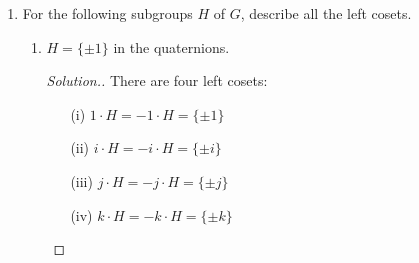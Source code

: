 \documentclass{article}
\newcommand{\sk}{\smallskip}
\begin{document}
\begin{enumerate}
\begin{proof}[Solution.]
        \sk

        Third, we show that $\psi$ is surjective, namely that for every $\varphi_g \in \{\varphi_g : g \in G\}$, there is a $hZ \in \{hZ : h \in G\}$ such that $\psi(hZ) = \varphi_g$. Take $h = g$, and then by definition, $\psi(hZ) = \psi(gZ) = \varphi_g$. Thus, $\psi$ is surjective. 

        \sk

        Fourth, we show that $\psi$ satisfies $\psi(ghZ) = \psi(gZ) \circ \psi(hZ)$. By definition, $\psi(ghZ) = \varphi_{gh}$. So for all $a \in G$, $\varphi_{gh}(a) = (gh)a(gh)^{-1}$. We know that $(gh)^{-1} = h^{-1}g^{-1}$, so $\varphi_{gh} = ghah^{-1}g^{-1}$. Next, we consider $\psi(gZ) \circ \psi(hZ)$. Since $\psi(hZ) = \varphi_h$, for all $a \in G$, $\varphi_h(a) = hah^{-1}$, so $(\psi(gZ) \circ \psi(hZ))(a) = (\psi(gZ))(hah^{-1})$. Similarly, for all $a \in G$, $\varphi_g(a) = gag^{-1}$, so $(\psi(gZ))(hah^{-1}) = ghah^{-1}g^{-1}$. This is identical to the result we got form $\psi(ghZ)$, so $\psi(ghZ) = \psi(gZ) \circ \psi(hZ)$. 
    \end{proof}
    

    \item For the following subgroups $H$ of $G$, describe all the left cosets.
    \begin{enumerate}
        \item $H = \{\pm 1\}$ in the quaternions.
        \begin{proof}[Solution.]
            There are four left cosets:
            \begin{enumerate}
                \item[(i)] $1\cdot H = -1 \cdot H = \{\pm 1\}$
                \item[(ii)] $i\cdot H = -i \cdot H = \{\pm i\}$
                \item[(iii)] $j\cdot H = -j \cdot H = \{\pm j\}$
                \item[(iv)] $k\cdot H = -k \cdot H = \{\pm k\}$
            \end{enumerate}
        \end{proof}
        

\end{enumerate}
\end{enumerate}
\end{document}
